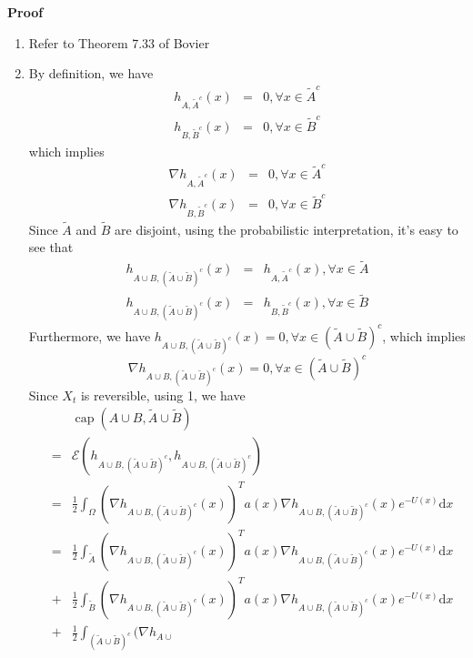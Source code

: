 \documentclass[english, aip, jcp, priprint, graphicx]{revtex4-1}
\newcommand{\mathd}{\mathrm{d}}
\newcommand{\tmop}[1]{\ensuremath{\operatorname{#1}}}
\theoremstyle{plain}
\theoremstyle{definition}
\theoremstyle{plain}
\begin{document}
\noindent\textbf{Proof\ }
\begin{enumerate}
\item Refer to Theorem 7.33 of Bovier\cite{Bovier2016-ez}

\item By definition, we have
\begin{eqnarray*}
h_{A, \widetilde{A^{}}^c} (x) & = & 0, \forall x \in \tilde{A}^c\\
h_{B, \tilde{B}^c} (x) & = & 0, \forall x \in \tilde{B}^c
\end{eqnarray*}
which implies
\begin{eqnarray*}
\nabla h_{A, \widetilde{A^{}}^c} (x) & = & 0, \forall x \in \tilde{A}^c\\
\nabla h_{B, \tilde{B}^c} (x) & = & 0, \forall x \in \tilde{B}^c
\end{eqnarray*}
Since $\tilde{A}$ and $\tilde{B}$ are disjoint, using the probabilistic interpretation, it's easy to see that
\begin{eqnarray*}
h_{A \cup B, (\tilde{A} \cup \tilde{B})^c} (x) & = & h_{A,
\widetilde{A^{}}^c} (x), \forall x \in \tilde{A}\\
h_{A \cup B, (\tilde{A} \cup \tilde{B})^c} (x) & = & h_{B, \tilde{B}^c}
(x), \forall x \in \tilde{B}
\end{eqnarray*}
Furthermore, we have $h_{A \cup B, (\tilde{A} \cup \tilde{B})^c} (x) = 0, \forall x \in (\tilde{A} \cup \tilde{B})^c$, which implies
\[ \nabla h_{A \cup B, (\tilde{A} \cup \tilde{B})^c} (x) = 0, \forall x \in
(\tilde{A} \cup \tilde{B})^c \]
Since $X_t$ is reversible, using 1, we have
\begin{eqnarray*}
&  & \tmop{cap} (A \cup B, \tilde{A} \cup \tilde{B})\\
& = & \mathcal{E} (h_{A \cup B, (\tilde{A} \cup \tilde{B})^c}, h_{A \cup
B, (\tilde{A} \cup \tilde{B})^c})\\
& = & \frac{1}{2} \int_{\Omega} (\nabla h_{A \cup B, (\tilde{A}
\cup \tilde{B})^c} (x))^T a (x) \nabla h_{A \cup B, (\tilde{A} \cup
\tilde{B})^c} (x) e^{- U (x)} \mathd x\\
& = & \frac{1}{2} \int_{\tilde{A}} (\nabla h_{A \cup B, (\tilde{A} \cup
\tilde{B})^c} (x))^T a (x) \nabla h_{A \cup B, (\tilde{A} \cup
\tilde{B})^c} (x) e^{- U (x)} \mathd x\\
& + & \frac{1}{2} \int_{\tilde{B}} (\nabla h_{A \cup B, (\tilde{A} \cup
\tilde{B})^c} (x))^T a (x) \nabla h_{A \cup B, (\tilde{A} \cup
\tilde{B})^c} (x) e^{- U (x)} \mathd x\\
& + & \frac{1}{2} \int_{(\tilde{A} \cup \tilde{B})^c} (\nabla h_{A \cup
}
\end{eqnarray*}
\end{enumerate}
\end{document}
